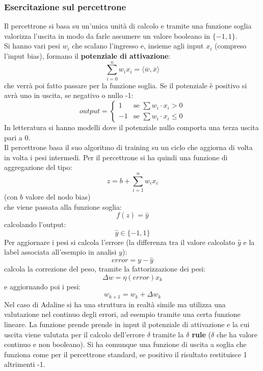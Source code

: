 					\subsubsection{Esercitazione sul percettrone}
					Il percettrone si basa su un'unica unità di calcolo e tramite una funzione
					soglia valorizza l'uscita in modo da farle assumere un valore booleano in
					$\{-1, 1\}$.\\
					Si hanno vari pesi $w_i$ che scalano l'ingresso e, insieme agli input $x_i$
					(compreso l'input bias),
					formano il \textbf{potenziale di attivazione}:
					\[\sum_{i=0}^nw_ix_i=\langle \overline{w}, \overline{x}\rangle\]
					che verrà poi fatto passare per la funzione
					soglia. Se il potenziale è positivo si avrà uno in uscita, se negativo o nullo
					-1:
					\[output=
						\begin{cases}
							1  & \mbox{se } \sum w_i\cdot x_i > 0    \\
							-1 & \mbox{se } \sum w_i\cdot x_i \leq 0 
						\end{cases}
					\]
					In letteratura si hanno modelli dove il potenziale nullo comporta una terza
					uscita pari a 0.\\
					Il percettrone basa il suo algoritmo di training su un ciclo che aggiorna di
					volta in volta i pesi intermedi.
					Per il percettrone si ha quindi una funzione di aggregazione del tipo:
					\[z=b+\sum_{i=1}^nw_ix_i\]
					(con $b$ valore del nodo bias)\\
					che viene passata alla funzione soglia:
					\[f(z)=\hat{y}\]
					calcolando l'output:
					\[\hat{y}\in\{-1, 1\}\]
					Per aggiornare i pesi si calcola l'errore (la differenza tra il valore calcolato
					$\hat{y}$ e la label associata all'esempio in analisi $y$):
					\[error=y-\hat{y}\]
					calcola la correzione del peso, tramite la fattorizzazione dei pesi:
					\[\Delta w=\eta(error)x_k\]
					e aggiornando poi i pesi:
					\[w_{k+1}=w_k+\Delta w_k\]
					Nel caso di Adaline si ha una struttura in realtà simile ma utilizza una
					valutazione nel continuo degli errori, ad esempio tramite una certa funzione
					lineare. La funzione prende prende in input il potenziale di attivazione e la
					cui uscita viene valutata per il calcolo dell'errore $\delta$ tramite la
					\textbf{$\delta$ rule} ($\delta$ che ha valore continuo e non booleano). Si ha
					comunque una funzione di uscita a soglia che funziona come per il percettrone
					standard, se positivo il risultato restituisce 1 altrimenti -1.\\
